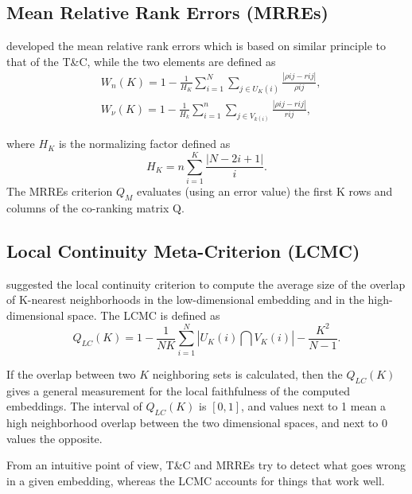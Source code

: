 \documentclass[11pt,a4paper,]{article}
\begin{document}
\hypertarget{mean-relative-rank-errors-mrres}{%
\subsection{Mean Relative Rank Errors (MRREs)}\label{mean-relative-rank-errors-mrres}}

\textcite{Lee2008-cx} developed the mean relative rank errors which is based on similar principle to that of the T\&C, while the two elements are defined as
\begin{equation}
\label{MRREs}
\begin{aligned}
&W_{n}(K)=1-\frac{1}{H_{K}} \sum_{i=1}^{N} \sum_{j \in U_{K}(i)} \frac{|\rho{ij}-r{ij}|}{\rho{ij}}, \\
&W_{\nu}(K)=1-\frac{1}{H_{k}} \sum_{i=1}^{n} \sum_{j \in V_{k(i)}} \frac{|\rho{ij}-r{ij}|}{r{ij}},
\end{aligned}
\end{equation}

where \(H_K\) is the normalizing factor defined as
\[
H_{K}=n \sum_{i=1}^{K} \frac{|N-2 i+1|}{i}.
\]
The MRREs criterion \(Q_M\) evaluates (using an error value) the first K rows and columns of the co-ranking matrix \(\mathrm{Q}\).

\hypertarget{local-continuity-meta-criterion-lcmc}{%
\subsection{Local Continuity Meta-Criterion (LCMC)}\label{local-continuity-meta-criterion-lcmc}}

\textcite{Chen2009-su} suggested the local continuity criterion to compute the average size of the overlap of K-nearest neighborhoods in the low-dimensional embedding and in the high-dimensional space. The LCMC is defined as
\begin{equation}
\label{LCMC}
Q_{LC}(K)=1-\frac{1}{N K} \sum_{i=1}^{N}\left| U_K(i) \bigcap V_K(i) \right|-\frac{K^{2}}{N-1}.
\end{equation}

If the overlap between two \(K\) neighboring sets is calculated, then the \(Q_{LC}(K)\) gives a general measurement for the local faithfulness of the computed embeddings. The interval of \(Q_{LC}(K)\) is \([0,1]\), and values next to 1 mean a high neighborhood overlap between the two dimensional spaces, and next to 0 values the opposite.

From an intuitive point of view, T\&C and MRREs try to detect what goes wrong in a given embedding, whereas the LCMC accounts for things that work well.
\end{document}
